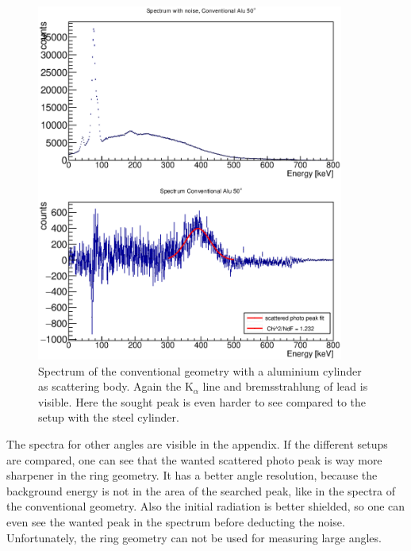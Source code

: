 \documentclass{article}
\begin{document}
\begin{figure}[H]
    \centering
    \includegraphics[width=0.9\textwidth]{Graphen/compton_spektren/50Alu.eps}
    \caption{Spectrum of the conventional geometry with a aluminium cylinder as scattering body. Again the K$_\alpha$ line and bremsstrahlung of lead is visible. Here the sought peak is even harder to see compared to the setup with the steel cylinder. }
\end{figure}
The spectra for other angles are visible in the appendix. If the different setups are compared, one can see that the wanted scattered photo peak is way more sharpener in the ring geometry.
It has a better angle resolution, because the background energy is not in the area of the searched peak, like in the spectra of the conventional geometry.
Also the initial radiation is better shielded, so one can even see the wanted peak in the spectrum before deducting the noise.
Unfortunately, the ring geometry can not be used for measuring large angles.
\end{document}
